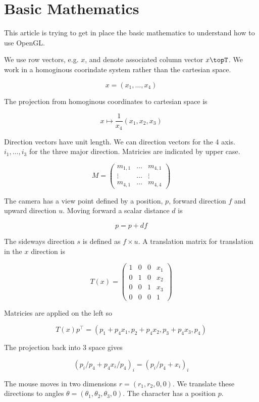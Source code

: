 \documentclass[12pt]{article}
\begin{document}
\section{Basic Mathematics}


This article is trying to get in place the basic mathematics to
understand how to use OpenGL.

We use row vectors, e.g. $x$, and denote associated column vector
$x\topT$. We work in a homoginous coorindate system rather than the
cartesian space.

\[
   x = (x_1,\dots,x_4)
\]

The projection from homoginous coordinates to cartesian space is

\[
   x \mapsto \frac{1}{x_4}(x_1, x_2, x_3)
\]

Direction vectors have unit length. We can direction vectors for the 4
axis. $i_1,\dots,i_3$ for the three major direction. Matricies
are indicated by upper case.

\[
   M = \left ( \begin{array}{ccc}
     m_{1,1} & \dots & m_{4,1}  \\
     \vdots & \dots & \vdots  \\
     m_{4,1} & \dots & m_{4,4}
     \end{array}
   \right )
\]

The camera has a view point defined by a position, $p$,
forward direction $f$ and upward direction $u$. Moving
forward a scalar distance $d$ is

\[
   p = p + df
\]

The sideways direction $s$ is defined as $f \times u$. A translation
matrix for translation in the $x$ direction is

\[
  T(x) = \left ( 
  \begin{array}{cccc}
     1 & 0 & 0 & x_1      \\
     0 & 1 & 0 & x_2      \\
     0 & 0 & 1 & x_3      \\
     0 & 0 & 0 & 1
  \end{array}
  \right )
\]

Matricies are applied on the left so

\[
  T(x) p^\top = (p_1 + p_4 x_1, p_2 + p_4 x_2, p_3 + p_4 x_3, p_4)
\]

The projection back into 3 space gives

\[
  (p_i / p_4 + p_4 x_i / p_4)_{i} = (p_i/p_4 + x_i)_{i}
\]

The mouse moves in two dimensions $r = (r_1, r_2, 0, 0)$. We translate
these directions to angles $\theta = (\theta_1, \theta_2, \theta_3, 0)$. The
character has a position $p$.
\end{document}

